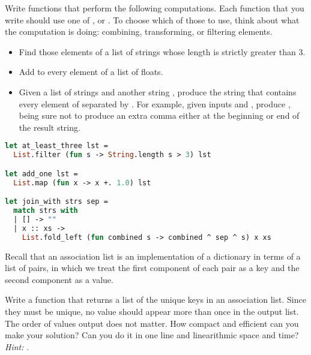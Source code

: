 Write functions that perform the following computations. Each function that you write should use one of ,  or . To choose which of those to use, think about what the computation is doing: combining, transforming, or filtering elements.
\begin{itemize}
  \item Find those elements of a list of strings whose length is strictly greater than 3.
  \item Add  to every element of a list of floats.
  \item Given a list of strings  and another string , produce the string that contains every element of  separated by . For example, given inputs \code{["hi";"bye"]} and , produce , being sure not to produce an extra comma either at the beginning or end of the result string.
\end{itemize}

\begin{lstlisting}[language=OCaml]
let at_least_three lst =
  List.filter (fun s -> String.length s > 3) lst

let add_one lst =
  List.map (fun x -> x +. 1.0) lst

let join_with strs sep =
  match strs with
  | [] -> ""
  | x :: xs ->
    List.fold_left (fun combined s -> combined ^ sep ^ s) x xs
\end{lstlisting}

Recall that an association list is an implementation of a dictionary in terms of a list of pairs, in which we treat the first component of each pair as a key and the second component as a value.

Write a function  that returns a list of the unique keys in an association list. Since they must be unique, no value should appear more than once in the output list. The order of values output does not matter. How compact and efficient can you make your solution? Can you do it in one line and linearithmic space and time? \textit{Hint: }.

